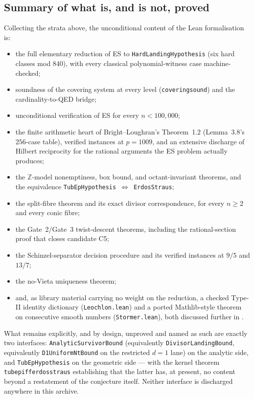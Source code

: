 \documentclass[11pt]{article}
\theoremstyle{plain}
\theoremstyle{definition}
\theoremstyle{remark}
\newcommand{\lean}[1]{\texttt{#1}}
\renewcommand{\_}{\textunderscore\allowbreak}
\newcommand{\Z}{\mathbb{Z}}
\begin{document}
\subsection{Summary of what is, and is not, proved}
\label{subsec:lean-summary}

Collecting the strata above, the unconditional content of the Lean formalisation is:
\begin{itemize}[leftmargin=1.4em]
  \item the full elementary reduction of ES to \lean{HardLandingHypothesis} (six hard classes
        mod 840), with every classical polynomial-witness case machine-checked;
  \item soundness of the covering system at every level (\lean{covering\_sound}) and the
        cardinality-to-QED bridge;
  \item unconditional verification of ES for every $n<100{,}000$;
  \item the finite arithmetic heart of Bright--Loughran's Theorem~1.2 (Lemma~3.8's $256$-case
        table), verified instances at $p=1009$, and an extensive discharge of Hilbert
        reciprocity for the rational arguments the ES problem actually produces;
  \item the $\Z$-model nonemptiness, box bound, and octant-invariant theorems, and the
        equivalence \lean{TubEpHypothesis}~$\iff$~\lean{ErdosStraus};
  \item the split-fibre theorem and its exact divisor correspondence, for every $n\ge2$ and
        every conic fibre;
  \item the Gate~2/Gate~3 twist-descent theorems, including the rational-section proof that
        closes candidate C5;
  \item the Schinzel-separator decision procedure and its verified instances at $9/5$ and
        $13/7$;
  \item the no-Vieta uniqueness theorem;
  \item and, as library material carrying no weight on the reduction, a checked Type-II
        identity dictionary (\lean{Leochlon.lean}) and a ported Mathlib-style theorem on
        consecutive smooth numbers (\lean{Stormer.lean}), both discussed further in
        .
\end{itemize}
What remains explicitly, and by design, unproved and named as such are exactly two interfaces:
\lean{AnalyticSurvivorBound} (equivalently \lean{DivisorLandingBound}, equivalently
\lean{D1UniformNtBound} on the restricted $d=1$ lane) on the analytic side, and
\lean{TubEpHypothesis} on the geometric side — with the kernel theorem
\lean{tub\_ep\_iff\_erdos\_straus} establishing that the latter has, at present, no content
beyond a restatement of the conjecture itself. Neither interface is discharged anywhere in this
archive.
\end{document}
